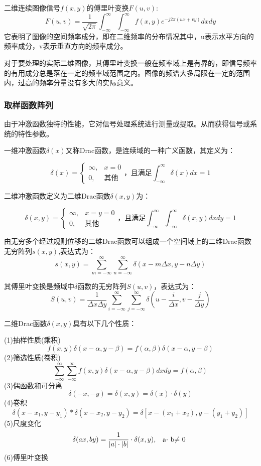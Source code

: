\documentclass[11pt]{article}
\begin{document}
二维连续图像信号$f(x,y)$的傅里叶变换$F(u,v)$:
$$F(u,v) = \frac{1}{\sqrt{2\pi}}\int_{-\infty}^{\infty}\int_{-\infty}^{\infty}f(x,y)e^{-j2\pi (ux+vy)}dxdy$$
它表明了图像的空间频率成分，即在二维频率的分布情况其中，u表示水平方向的频率成分，v表示垂直方向的频率成分。

对于要处理的实际二维图像，其傅里叶变换一般在频率域上是有界的，即信号频率的有用成分总是落在一定的频率域范围之内。图像的频谱大多局限在一定的范围内，过高的频率分量没有多大的实际意义。
\subsubsection{取样函数阵列}
由于冲激函数独特的性能，它对信号处理系统进行测量或提取。从而获得信号或系统的特性参数。

一维冲激函数$\delta(x)$又称Drac函数，是连续域的一种广义函数，其定义为：

$$\delta(x)  = \left\{\begin{matrix}
	\infty, &x = 0 \\ 0, &\text{其他}
\end{matrix}\right. \text{，且满足} \int_{-\infty}^{\infty}\delta(x)dx = 1$$

二维冲激函数定义为二维Drac函数$\delta(x,y)$为：

$$\delta(x,y)  = \left\{\begin{matrix}
	\infty, &x = y = 0 \\ 0, &\text{其他}
\end{matrix}\right. \text{，且满足} \int_{-\infty}^{\infty}\int_{-\infty}^{\infty}\delta(x,y)dxdy = 1$$

由无穷多个经过规则位移的二维Drac函数可以组成一个空间域上的二维Drac函数无穷阵列$s(x,y)$,表达式为：
$$s(x,y) = \sum_{m=-\infty}^{\infty}\sum_{n=-\infty}^{\infty}\delta(x - m\Delta x,y - n\Delta y)$$

其傅里叶变换是频域中$\delta$函数的无穷阵列$S(u,v)$，表达式为：
$$S(u,v) = \frac{1}{\Delta x\Delta y}\sum_{i=-\infty}^{\infty}\sum_{j=-\infty}^{\infty}\delta(u - \frac{i}{\Delta x},v - \frac{j}{\Delta y})$$

二维Drac函数$\delta(x,y)$具有以下几个性质：

\noindent(1)抽样性质(乘积)$$f(x,y)\delta(x-\alpha,y-\beta)=f(\alpha,\beta)\delta(x-\alpha,y-\beta)$$
\noindent(2)筛选性质(卷积)$$\sum_{-\infty}^{\infty}\sum_{-\infty}^{\infty}f(x,y)\delta(x-\alpha,y-\beta)dxdy=f(\alpha,\beta)$$
\noindent(3)偶函数和可分离$$\delta(-x,-y)=\delta(x,y)=\delta(x)\cdot\delta(y)$$
\noindent(4)卷积$$\delta(x-x_1,y-y_1)\ast\delta(x-x_2,y-y_2)=\delta[x-(x_1+x_2),y-(y_1+y_2)]$$
\noindent(5)尺度变化$$\delta(ax,by)=\frac{1}{\left|a\right |\cdot \left|b\right |}\cdot\delta(x,y)\text{,\quad a$\cdot$ b$\neq$ 0 }$$
\noindent(6)傅里叶变换
\end{document}
